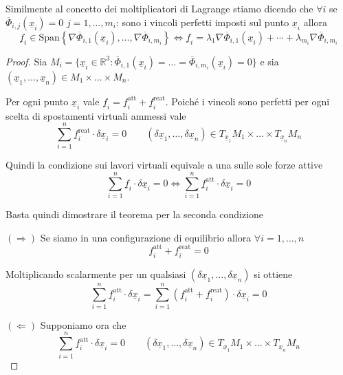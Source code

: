 \begin{oss}{}
Similmente al concetto dei moltiplicatori di Lagrange stiamo dicendo che \(\forall i\) se \(\overline{\Phi}_{i,j}(\underline{x}_i)=0\) \(j=1,\ldots,m_i\): sono i vincoli perfetti imposti sul punto \(\underline{x}_i\) allora
\[
\underline{f}_i\in \mathrm{Span}\left\{\nabla \overline{\Phi}_{i,1}(\underline{x}_i),\ldots,\nabla \overline{\Phi}_{i,m_i}\right\}
\Longleftrightarrow
\underline{f}_i=\lambda_1\nabla \overline{\Phi}_{i,1}(\underline{x}_i)+\cdots+\lambda_{m_i}\nabla \overline{\Phi}_{i,m_i}
\]
\end{oss}
\begin{proof}
Sia \(M_i=\{\underline{x}_i\in\mathbb{R}^3:\overline{\Phi}_{i,1}(\underline{x}_i)=\ldots=\overline{\Phi}_{i,m_i}(\underline{x}_i)=0\}\) e sia \((\underline{x}_1,\ldots,\underline{x}_n)\in M_1\times\ldots\times M_n\).

Per ogni punto \(\underline{x}_i\) vale \(\underline{f}_i=\underline{f}_i^{\mathrm{att}}+\underline{f}_i^{\mathrm{reat}}\). Poiché i vincoli sono perfetti per ogni scelta di spostamenti virtuali ammessi vale
\[
\sum_{i=1}^{n}\underline{f}_i^{\mathrm{reat}}\cdot \delta \underline{x}_i=0
\qquad
(\delta \underline{x}_1,\ldots,\delta \underline{x}_n)\in T_{\underline{x}_1}M_1\times\ldots\times T_{\underline{x}_n}M_n
\]

Quindi la condizione sui lavori virtuali equivale a una sulle sole forze attive
\[
\sum_{i=1}^{n}\underline{f}_i\cdot \delta \underline{x}_i=0
\Longleftrightarrow
\sum_{i=1}^{n}\underline{f}_i^{\mathrm{att}}\cdot \delta \underline{x}_i=0
\]

Basta quindi dimostrare il teorema per la seconda condizione

\((\Rightarrow)\) Se siamo in una configurazione di equilibrio allora \(\forall i=1,\ldots,n\)
\[
\underline{f}_i^{\mathrm{att}}+\underline{f}_i^{\mathrm{reat}}=0
\]

Moltiplicando scalarmente per un qualsiasi \((\delta \underline{x}_1,\ldots,\delta \underline{x}_n)\) si ottiene
\[
\sum_{i=1}^{n}\underline{f}_i^{\mathrm{att}}\cdot \delta \underline{x}_i=
\sum_{i=1}^{n}\left(\underline{f}_i^{\mathrm{att}}+\underline{f}_i^{\mathrm{reat}}\right)\cdot \delta \underline{x}_i=0
\]

\((\Leftarrow)\) Supponiamo ora che
\[
\sum_{i=1}^{n}\underline{f}_i^{\mathrm{att}}\cdot \delta \underline{x}_i=0
\qquad
(\delta \underline{x}_1,\ldots,\delta \underline{x}_n)\in T_{\underline{x}_1}M_1\times\ldots\times T_{\underline{x}_n}M_n
\]


\end{proof}
